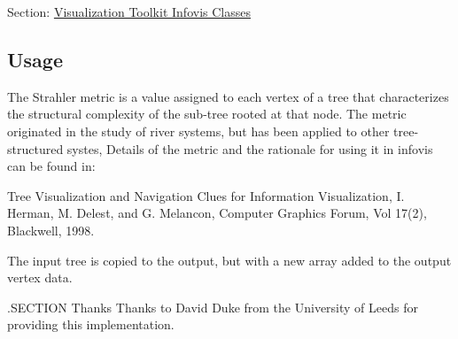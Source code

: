 Section\-: \hyperlink{sec_vtkinfovis}{Visualization Toolkit Infovis Classes} \hypertarget{vtkwidgets_vtkxyplotwidget_Usage}{}\subsection{Usage}\label{vtkwidgets_vtkxyplotwidget_Usage}
The Strahler metric is a value assigned to each vertex of a tree that characterizes the structural complexity of the sub-\/tree rooted at that node. The metric originated in the study of river systems, but has been applied to other tree-\/ structured systes, Details of the metric and the rationale for using it in infovis can be found in\-:

Tree Visualization and Navigation Clues for Information Visualization, I. Herman, M. Delest, and G. Melancon, Computer Graphics Forum, Vol 17(2), Blackwell, 1998.

The input tree is copied to the output, but with a new array added to the output vertex data.

.S\-E\-C\-T\-I\-O\-N Thanks Thanks to David Duke from the University of Leeds for providing this implementation.

